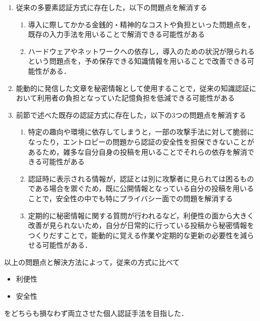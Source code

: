 \begin{enumerate}
  \item 従来の多要素認証方式に存在した，以下の問題点を解消する
  \begin{enumerate}
    \item 導入に際してかかる金銭的・精神的なコストや負担といった問題点を，既存の入力手法を用いることで解消できる可能性がある
    \item ハードウェアやネットワークへの依存し，導入のための状況が限られるという問題点を，予め保存できる知識情報を用いることで改善できる可能性がある．
  \end{enumerate}
  \item 能動的に発信した文章を秘密情報として使用することで，従来の知識認証において利用者の負担となっていた記憶負担を低減できる可能性がある
  \item 前節で述べた既存の認証方式に存在した，以下の3つの問題点を解消する
  \begin{enumerate}
    \item 特定の趣向や環境に依存してしまうと，一部の攻撃手法に対して脆弱になったり，エントロピーの問題から認証の安全性を担保できないことがあるため，雑多な自分自身の投稿を用いることでそれらの依存を解消できる可能性がある
    \item 認証時に表示される情報が，認証とは別に攻撃者に見られては困るものである場合を禦ぐため，既に公開情報となっている自分の投稿を用いることで，安全性の中でも特にプライバシー面での問題を解消する
    \item 定期的に秘密情報に関する質問が行われるなど，利便性の面から大きく改善が見られないため，自分が日常的に行っている投稿から秘密情報をつくりだすことで，能動的に覚える作業や定期的な更新の必要性を減らせる可能性がある．
  \end{enumerate}
\end{enumerate}

以上の問題点と解決方法によって，従来の方式に比べて
\begin{itemize}
  \item 利便性
  \item 安全性
\end{itemize}
をどちらも損なわず両立させた個人認証手法を目指した．

